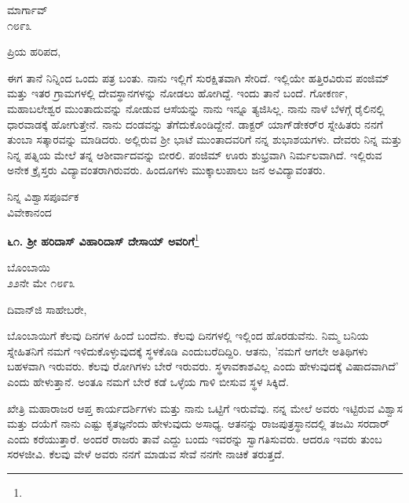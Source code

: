 \vspace{-0.75cm}

\begin{flushright}
ಮಾರ್ಗಾವ್\\೧೮೯೩
\end{flushright}
\vspace{-0.3cm}

\noindent
ಪ್ರಿಯ ಹರಿಪದ,

ಈಗ ತಾನೆ ನಿನ್ನಿಂದ ಒಂದು ಪತ್ರ ಬಂತು. ನಾನು ಇಲ್ಲಿಗೆ ಸುರಕ್ಷಿತವಾಗಿ ಸೇರಿದೆ. ಇಲ್ಲಿಯೇ ಹತ್ತಿರವಿರುವ ಪಂಜಿಮ್ ಮತ್ತು ಇತರ ಗ್ರಾಮಗಳಲ್ಲಿ ದೇವಸ್ಥಾನಗಳನ್ನು ನೋಡಲು ಹೋಗಿದ್ದೆ. ಇಂದು ತಾನೆ ಬಂದೆ. ಗೋಕರ್ಣ, ಮಹಾಬಲೇಶ್ವರ ಮುಂತಾದುವನ್ನು ನೋಡುವ ಆಸೆಯನ್ನು ನಾನು ಇನ್ನೂ ತ್ಯಜಿಸಿಲ್ಲ. ನಾನು ನಾಳೆ ಬೆಳಗ್ಗೆ ರೈಲಿನಲ್ಲಿ ಧಾರವಾಡಕ್ಕೆ ಹೋಗುತ್ತೇನೆ. ನಾನು ದಂಡವನ್ನು  ತೆಗೆದುಕೊಂಡಿದ್ದೇನೆ. ಡಾಕ್ಟರ್ ಯಾಗ್‌ಡೇಕರ್‌ರ ಸ್ನೇಹಿತರು ನನಗೆ ತುಂಬಾ ಸತ್ಕಾರವನ್ನು ಮಾಡಿದರು. ಅಲ್ಲಿರುವ ಶ‍್ರೀ ಭಾಟೆ ಮುಂತಾದವರಿಗೆ ನನ್ನ ಶುಭಾಶಯಗಳು. ದೇವರು ನಿನ್ನ ಮತ್ತು ನಿನ್ನ ಪತ್ನಿಯ ಮೇಲೆ ತನ್ನ ಆಶೀರ್ವಾದವನ್ನು ಬೀರಲಿ. ಪಂಜಿಮ್ ಊರು ಶುಭ್ರವಾಗಿ ನಿರ್ಮಲವಾಗಿದೆ. ಇಲ್ಲಿರುವ ಅನೇಕ ಕ್ರೈಸ್ತರು ವಿದ್ಯಾವಂತರಾಗಿರುವರು. ಹಿಂದೂಗಳು ಮುಕ್ಕಾಲುಪಾಲು ಜನ ಅವಿದ್ಯಾವಂತರು.

\vspace{-0.55cm}

{\flushright
ನಿನ್ನ ವಿಶ್ವಾಸಪೂರ್ವಕ\\ವಿವೇಕಾನಂದ\par}

\begin{center}
\textbf{೬೧. ಶ‍್ರೀ ಹರಿದಾಸ್ ವಿಹಾರಿದಾಸ್ ದೇಸಾಯ್ ಅವರಿಗೆ}\footnote{}
\end{center}

\vspace{-0.65cm}

\begin{flushright}
ಬೊಂಬಾಯಿ\\೨೨ನೇ ಮೇ ೧೮೯೩
\end{flushright}

\noindent
ದಿವಾನ್‌ಜಿ ಸಾಹೇಬರೇ,

ಬೊಂಬಾಯಿಗೆ ಕೆಲವು ದಿನಗಳ ಹಿಂದೆ ಬಂದೆನು. ಕೆಲವು ದಿನಗಳಲ್ಲಿ ಇಲ್ಲಿಂದ ಹೊರಡುವೆನು. ನಿಮ್ಮ ಬನಿಯ ಸ್ನೇಹಿತನಿಗೆ ನಮಗೆ ಇಳಿದುಕೊಳ್ಳುವುದಕ್ಕೆ ಸ್ಥಳಕೊಡಿ ಎಂದು\break ಬರೆದಿದ್ದಿರಿ. ಆತನು, ’ನಮಗೆ ಆಗಲೇ ಅತಿಥಿಗಳು ಬಹಳವಾಗಿ ಇರುವರು. ಕೆಲವು ರೋಗಿಗಳು ಬೇರೆ ಇರುವರು. ಸ್ಥಳಾವಕಾಶವಿಲ್ಲ ಎಂದು ಹೇಳುವುದಕ್ಕೆ ವಿಷಾದವಾಗಿದೆ’ ಎಂದು ಹೇಳುತ್ತಾನೆ. ಅಂತೂ ನಮಗೆ ಬೇರೆ ಕಡೆ ಒಳ್ಳೆಯ ಗಾಳಿ ಬೀಸುವ ಸ್ಥಳ ಸಿಕ್ಕಿದೆ.

ಖೇತ್ರಿ ಮಹಾರಾಜರ ಆಪ್ತ ಕಾರ್ಯದರ್ಶಿಗಳು ಮತ್ತು ನಾನು ಒಟ್ಟಿಗೆ ಇರುವೆವು. ನನ್ನ ಮೇಲೆ ಅವರು ಇಟ್ಟಿರುವ ವಿಶ್ವಾಸ ಮತ್ತು ದಯೆಗೆ ನಾನು ಎಷ್ಟು ಕೃತಜ್ಞನೆಂದು ಹೇಳುವುದು ಅಸಾಧ್ಯ. ಆತನನ್ನು ರಾಜಪುತ್ರಸ್ಥಾನದಲ್ಲಿ ತಜಮಿ ಸರದಾರ್ ಎಂದು ಕರೆಯುತ್ತಾರೆ. ಅಂದರೆ ರಾಜರು ತಾವೆ ಎದ್ದು ಬಂದು ಇವರನ್ನು ಸ್ವಾಗತಿಸುವರು. ಆದರೂ ಇವರು ತುಂಬ ಸರಳಜೀವಿ. ಕೆಲವು ವೇಳೆ ಅವರು ನನಗೆ ಮಾಡುವ ಸೇವೆ ನನಗೇ ನಾಚಿಕೆ ತರುತ್ತದೆ.

